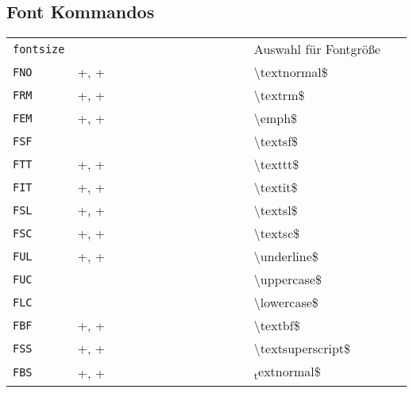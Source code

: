 \documentclass[8pt]{extarticle} %
\begin{document}
\begin{multicols}{3}
  \vspace*{1ex}
  \subsection{Font Kommandos}
  \vspace*{1ex}
	\begin{tabular}{L{0.15\linewidth} L{0.45\linewidth} L{0.5\linewidth}}
  \tt fontsize & & Auswahl für Fontgröße \\
	\tt FNO & \Ctrl +, \Ctrl + & \textbackslash textnormal\textbraceleft\$\textbraceright\textbraceright \\
	\tt FRM & \Ctrl +, \Ctrl + & \textbackslash textrm\textbraceleft\$\textbraceright\textbraceright \\
	\tt FEM & \Ctrl +, \Ctrl + & \textbackslash emph\textbraceleft\$\textbraceright\textbraceright \\
	\tt FSF &  & \textbackslash textsf\textbraceleft\$\textbraceright\textbraceright \\
	\tt FTT & \Ctrl +, \Ctrl + & \textbackslash texttt\textbraceleft\$\textbraceright\textbraceright \\
	\tt FIT & \Ctrl +, \Ctrl + & \textbackslash textit\textbraceleft\$\textbraceright\textbraceright \\
	\tt FSL & \Ctrl +, \Ctrl + & \textbackslash textsl\textbraceleft\$\textbraceright\textbraceright \\
	\tt FSC & \Ctrl +, \Ctrl + & \textbackslash textsc\textbraceleft\$\textbraceright\textbraceright \\
	\tt FUL & \Ctrl +, \Ctrl + & \textbackslash underline\textbraceleft\$\textbraceright\textbraceright \\
	\tt FUC &  & \textbackslash uppercase\textbraceleft\$\textbraceright\textbraceright \\
	\tt FLC &  & \textbackslash lowercase\textbraceleft\$\textbraceright\textbraceright \\
	\tt FBF & \Ctrl +, \Ctrl + & \textbackslash textbf\textbraceleft\$\textbraceright\textbraceright \\
	\tt FSS & \Ctrl +, \Ctrl + & \textbackslash textsuperscript\textbraceleft\$\textbraceright\textbraceright \\
	\tt FBS & \Ctrl +, \Ctrl +\keystroke{-} & \textsubscript textnormal\textbraceleft\$\textbraceright\textbraceright \\
	 \end{tabular}
		

\end{multicols}
\end{document}
